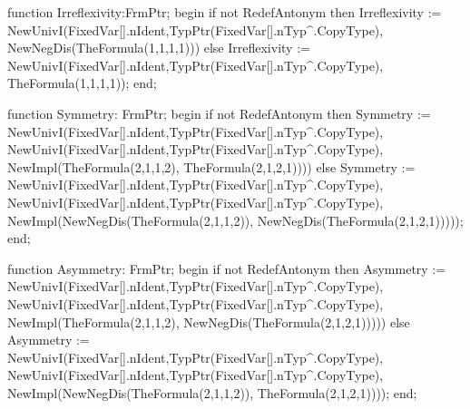    function Irreflexivity:FrmPtr;
   begin
      if not RedefAntonym then
         Irreflexivity := 
            NewUnivI(FixedVar[].nIdent,TypPtr(FixedVar[].nTyp^.CopyType),
                     NewNegDis(TheFormula(1,1,1,1)))
      else Irreflexivity := 
         NewUnivI(FixedVar[].nIdent,TypPtr(FixedVar[].nTyp^.CopyType),
                  TheFormula(1,1,1,1));
   end;
   
   function Symmetry: FrmPtr;
   begin
      if not RedefAntonym then Symmetry := 
         NewUnivI(FixedVar[].nIdent,TypPtr(FixedVar[].nTyp^.CopyType),
                  NewUnivI(FixedVar[].nIdent,TypPtr(FixedVar[].nTyp^.CopyType),
                           NewImpl(TheFormula(2,1,1,2),
                                   TheFormula(2,1,2,1))))
      else Symmetry := 
         NewUnivI(FixedVar[].nIdent,TypPtr(FixedVar[].nTyp^.CopyType),
                  NewUnivI(FixedVar[].nIdent,TypPtr(FixedVar[].nTyp^.CopyType),
                           NewImpl(NewNegDis(TheFormula(2,1,1,2)),
                                   NewNegDis(TheFormula(2,1,2,1)))));
   end;
   
   function Asymmetry: FrmPtr;
   begin
      if not RedefAntonym then Asymmetry := 
         NewUnivI(FixedVar[].nIdent,TypPtr(FixedVar[].nTyp^.CopyType),
                  NewUnivI(FixedVar[].nIdent,TypPtr(FixedVar[].nTyp^.CopyType),
                           NewImpl(TheFormula(2,1,1,2),
                                   NewNegDis(TheFormula(2,1,2,1)))))
      else Asymmetry := 
         NewUnivI(FixedVar[].nIdent,TypPtr(FixedVar[].nTyp^.CopyType),
                  NewUnivI(FixedVar[].nIdent,TypPtr(FixedVar[].nTyp^.CopyType),
                           NewImpl(NewNegDis(TheFormula(2,1,1,2)),
                                   TheFormula(2,1,2,1))));
   end;
   
